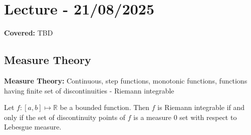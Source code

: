 \documentclass{functionspaces}
\begin{document}
\endgroup


\newpage
\section{Lecture - 21/08/2025}

\textbf{Covered:} TBD

\begingroup
\setlength{\parskip}{6pt}
\setlength{\parindent}{0pt}

\subsection{Measure Theory}

\textbf{Measure Theory:} Continuous, step functions, monotonic functions, functions having finite set of discontinuities - Riemann integrable

\begin{theorem}
Let \( f:[a,b] \mapsto \mathbb{R} \) be a bounded function. Then \( f \) is Riemann integrable if and only if the set of discontinuity points of \( f \) is a measure 0 set with respect to Lebesgue measure.
\end{theorem}
\end{document}
